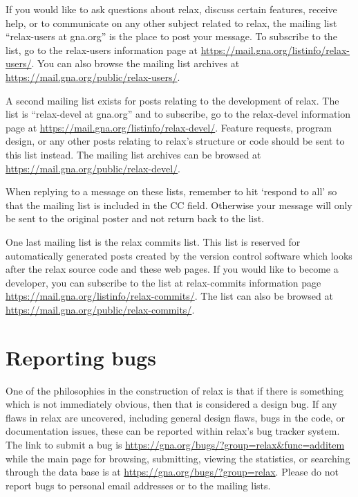 If you would like to ask questions about relax, discuss certain features, receive help, or to communicate on any other subject related to relax, the mailing list ``relax-users at gna.org'' is the place to post your message.  To subscribe to the list, go to the relax-users information page at \href{https://mail.gna.org/listinfo/relax-users/}{https://mail.gna.org/listinfo/relax-users/}.  You can also browse the mailing list archives at \href{https://mail.gna.org/public/relax-users/}{https://mail.gna.org/public/relax-users/}.

A second mailing list exists for posts relating to the development of relax.  The list is ``relax-devel at gna.org'' and to subscribe, go to the relax-devel information page at \href{https://mail.gna.org/listinfo/relax-devel/}{https://mail.gna.org/listinfo/relax-devel/}.  Feature requests, program design, or any other posts relating to relax's structure or code should be sent to this list instead.  The mailing list archives can be browsed at \href{https://mail.gna.org/public/relax-devel/}{https://mail.gna.org/public/relax-devel/}.

When replying to a message on these lists, remember to hit `respond to all' so that the mailing list is included in the CC field.  Otherwise your message will only be sent to the original poster and not return back to the list.

One last mailing list is the relax commits list.  This list is reserved for automatically generated posts created by the version control software which looks after the relax source code and these web pages.  If you would like to become a developer, you can subscribe to the list at relax-commits information page \href{https://mail.gna.org/listinfo/relax-commits/}{https://mail.gna.org/listinfo/relax-commits/}. The list can also be browsed at \href{https://mail.gna.org/public/relax-commits/}{https://mail.gna.org/public/relax-commits/}.




\section{Reporting bugs}\label{reporting bugs}

One of the philosophies in the construction of relax is that if there is something which is not immediately obvious, then that is considered a design bug.  If any flaws in relax are uncovered, including general design flaws, bugs in the code, or documentation issues, these can be reported within relax's bug tracker system.  The link to submit a bug is \href{https://gna.org/bugs/?group=relax\&func=additem}{https://gna.org/bugs/?group=relax\&func=additem} while the main page for browsing, submitting, viewing the statistics, or searching through the data base is at \href{https://gna.org/bugs/?group=relax}{https://gna.org/bugs/?group=relax}.  Please do not report bugs to personal email addresses or to the mailing lists.

